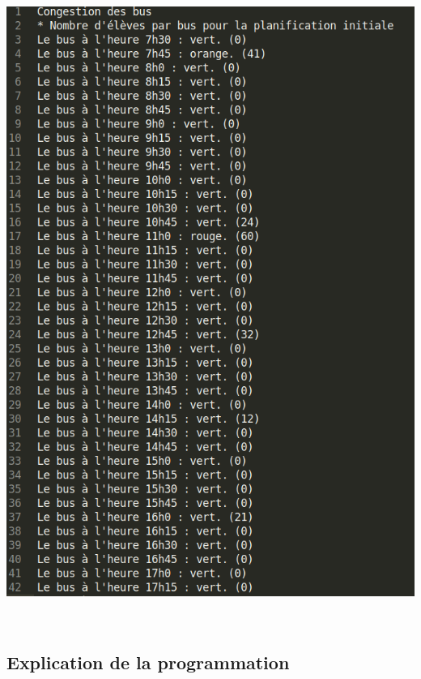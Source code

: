 \documentclass[a4paper,11pt]{article}
\begin{document}
 			\centerline{\includegraphics[scale=0.2]{Captures/resultat2.png}}\\

	\subsection{Explication de la programmation}
\end{document}
